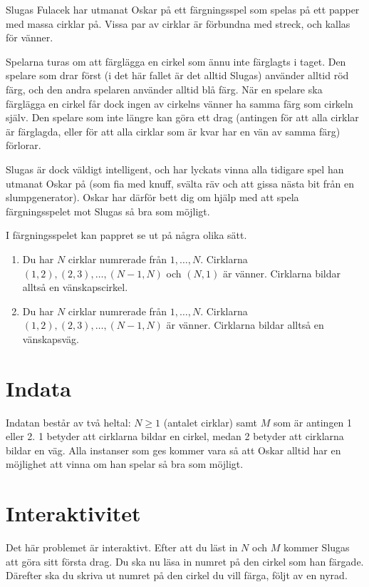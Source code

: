 Slugas Fulacek har utmanat Oskar på ett färgningsspel som spelas på ett papper med massa cirklar på. Vissa par av cirklar är förbundna med streck, och kallas för vänner.

Spelarna turas om att färglägga en cirkel som ännu inte färglagts i taget. Den spelare som drar först (i det här fallet är det alltid Slugas) använder alltid röd färg, och den andra spelaren använder alltid blå färg. När en spelare ska färglägga en cirkel får dock ingen av cirkelns vänner ha samma färg som cirkeln själv. Den spelare som inte längre kan göra ett drag (antingen för att alla cirklar är färglagda, eller för att alla cirklar som är kvar har en vän av samma färg) förlorar.

Slugas är dock väldigt intelligent, och har lyckats vinna alla tidigare spel han utmanat Oskar på (som fia med knuff, svälta räv och att gissa nästa bit från en slumpgenerator). Oskar har därför bett dig om hjälp med att spela färgningsspelet mot Slugas så bra som möjligt.

I färgningsspelet kan pappret se ut på några olika sätt.

\begin{enumerate}
\item Du har $N$ cirklar numrerade från $1, \dots, N$. Cirklarna $(1, 2), (2, 3), \dots, (N-1, N)$ och $(N, 1)$ är vänner. Cirklarna bildar alltså en vänskapscirkel.
\item Du har $N$ cirklar numrerade från $1, \dots, N$. Cirklarna $(1, 2), (2, 3), \dots, (N-1, N)$ är vänner. Cirklarna bildar alltså en vänskapsväg.
\end{enumerate}

\section*{Indata}

Indatan består av två heltal: $N \ge 1$ (antalet cirklar) samt $M$ som är antingen 1 eller 2. 1 betyder att cirklarna bildar en cirkel, medan 2 betyder att cirklarna bildar en väg. Alla instanser som ges kommer vara så att Oskar alltid har en möjlighet att vinna om han spelar så bra som möjligt.

\section*{Interaktivitet}
Det här problemet är interaktivt. Efter att du läst in $N$ och $M$ kommer Slugas att göra sitt första drag. Du ska nu läsa in numret på den cirkel som han färgade. Därefter ska du skriva ut numret på den cirkel du vill färga, följt av en nyrad.


